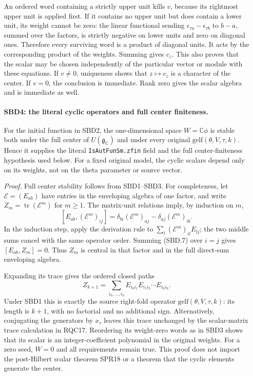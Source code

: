 \documentclass[11pt,a4paper]{article}
\numberwithin{equation}{section}
\theoremstyle{remark}\newtheorem{remark}[theorem]{Remark}
\begin{document}
An ordered word containing a strictly upper unit kills \(v\),
because its rightmost upper unit is applied first.  If it contains
no upper unit but does contain a lower unit, its weight cannot be
zero: the linear functional sending
\(\epsilon_{\tau a}-\epsilon_{\tau b}\) to \(b-a\), summed over
the factors, is strictly negative on lower units and zero on
diagonal ones.  Therefore every surviving word is a product of
diagonal units.  It acts by the corresponding product of the
weights.  Summing gives \(c_z\).  This also proves that the scalar
may be chosen independently of the particular vector or module
with these equations.  If \(v\ne0\), uniqueness shows that
\(z\mapsto c_z\) is a character of the center.  If \(v=0\), the
conclusion is immediate.  Rank zero gives the scalar algebra and
is immediate as well.

\paragraph{SBD4: the literal cyclic operators and full center finiteness.}
\label{claim:SBD4}
For the initial function in SBD2, the one-dimensional space
\(W=\mathbb C\phi\) is stable both under the full center of
\(U(\mathfrak g_{\mathbb C})\) and under every original
\(\mathrm{gelf}(\theta,V,\tau,k)\).  Hence it supplies the literal
\texttt{Is\allowbreak Aut\allowbreak Fun\allowbreak Sm.\allowbreak zfin} field and the full center-finiteness
hypothesis used below.  For a fixed original model, the cyclic
scalars depend only on its weights, not on the theta parameter or
source vector.

\emph{Proof.}
Full center stability follows from SBD1--SBD3.  For completeness,
let \(\mathcal E=(E_{ab})\) have entries in the enveloping algebra
of one factor, and write \(Z_m=\operatorname{tr}(\mathcal E^m)\)
for \(m\ge1\).  The matrix-unit relations imply, by induction on
\(m\),
\[
 [E_{ab},(\mathcal E^m)_{ij}]
   =\delta_{bi}(\mathcal E^m)_{aj}
      -\delta_{aj}(\mathcal E^m)_{ib}.
 \tag{SBD.7}
\]
In the induction step, apply the derivation rule to
\(\sum_l(\mathcal E^m)_{il}E_{lj}\); the two middle sums cancel
with the same operator order.  Summing (SBD.7) over \(i=j\)
gives \([E_{ab},Z_m]=0\).  Thus \(Z_m\) is central in that
factor and in the full direct-sum enveloping algebra.

Expanding its trace gives the ordered closed paths
\[
 Z_{k+1}=\sum_{i_0,\ldots,i_k}
 E_{i_0i_1}E_{i_1i_2}\cdots E_{i_ki_0}.
 \tag{SBD.8}
\]
Under SBD1 this is exactly the source right-fold operator
\(\mathrm{gelf}(\theta,V,\tau,k)\): its length is \(k+1\), with
no factorial and no additional sign.  Alternatively, conjugating
the generators by \(x_\tau\) leaves this trace unchanged by the
scalar-matrix trace calculation in RQC17.  Reordering its
weight-zero words as in SBD3 shows that its scalar is an
integer-coefficient polynomial in the original weights.  For a
zero seed, \(W=0\) and all requirements remain true.  This proof
does not import the post-Hilbert scalar theorem SPR18 or a theorem
that the cyclic elements generate the center.
\end{document}
